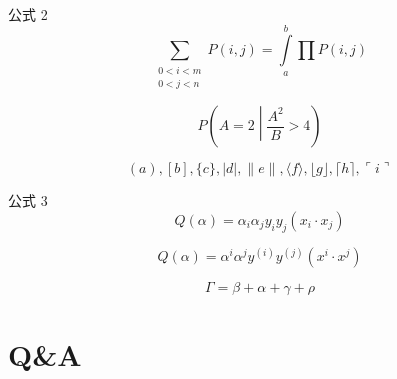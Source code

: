 \begin{frame}{公式 2}
    $$\sum_{\substack{0<i<m \\ 0<j<n }} 
      P(i,j)=\int\limits_a^b\prod P(i,j)$$

    $$P\left(A=2\middle|\frac{A^2}{B}>4\right)$$

    $$( a ), [ b ], \{ c \}, | d |, \| e \|,
    \langle f \rangle, \lfloor g \rfloor,
    \lceil h \rceil, \ulcorner i \urcorner$$
\end{frame}

\begin{frame}{公式 3}
    $$Q(\alpha)=\alpha_i\alpha_jy_iy_j(x_i\cdot x_j)$$

    $$Q(\alpha)=\alpha^i\alpha^jy^{(i)}y^{(j)}(x^i\cdot x^j)$$
    
    $$\Gamma=\beta+\alpha+\gamma+\rho$$
\end{frame}



\section*{Q\&A}
\begin{frame}
    \centering
    \vspace{2.2cm}


    \vspace{0.4cm}{\Large\itshape \faSlideshare~希望老师批评指正！}
\end{frame}